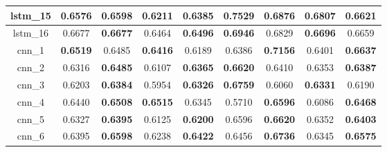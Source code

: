 \begin{table}[hp]
\begin{tabular} {|c|c|c|c|c|c|c|c|c| }
        lstm\_15 & 0.6576                              & \textbf{0.6598}                     & 0.6211                              & \textbf{0.6385}                     & \textbf{0.7529}                     & 0.6876                              & \textbf{0.6807}                     & 0.6621                              \\ \hline
        lstm\_16 & 0.6677                              & \textbf{0.6677}                     & 0.6464                              & \textbf{0.6496}                     & \textbf{0.6946}                     & 0.6829                              & \textbf{0.6696}                     & 0.6659                              \\ \hline
        cnn\_1   & \textbf{0.6519}                     & 0.6485                              & \textbf{0.6416}                     & 0.6189                              & 0.6386                              & \textbf{0.7156}                     & 0.6401                              & \textbf{0.6637}                     \\ \hline
        cnn\_2   & 0.6316                              & \textbf{0.6485}                     & 0.6107                              & \textbf{0.6365}                     & \textbf{0.6620}                     & 0.6410                              & 0.6353                              & \textbf{0.6387}                     \\ \hline
        cnn\_3   & 0.6203                              & \textbf{0.6384}                     & 0.5954                              & \textbf{0.6326}                     & \textbf{0.6759}                     & 0.6060                              & \textbf{0.6331}                     & 0.6190                              \\ \hline
        cnn\_4   & 0.6440                              & \textbf{0.6508}                     & \textbf{0.6515}                     & 0.6345                              & 0.5710                              & \textbf{0.6596}                     & 0.6086                              & \textbf{0.6468}                     \\ \hline
        cnn\_5   & 0.6327                              & \textbf{0.6395}                     & 0.6125                              & \textbf{0.6200}                     & 0.6596                              & \textbf{0.6620}                     & 0.6352                              & \textbf{0.6403}                     \\ \hline
        cnn\_6   & 0.6395                              & \textbf{0.6598}                     & 0.6238                              & \textbf{0.6422}                     & 0.6456                              & \textbf{0.6736}                     & 0.6345                              & \textbf{0.6575}                     \\ \hline

\end{tabular}
\end{table}
